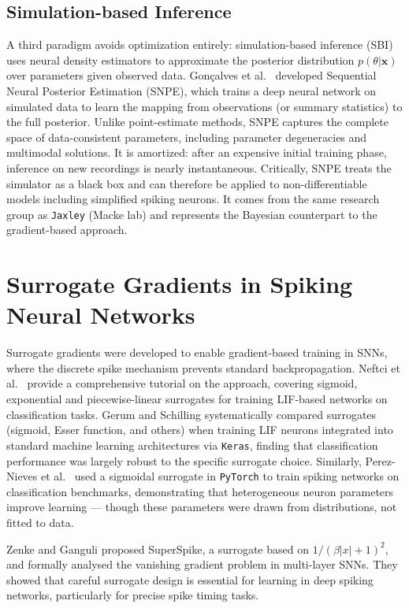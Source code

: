 \subsection{Simulation-based Inference}
A third paradigm avoids optimization entirely: simulation-based inference (SBI) uses neural density estimators to approximate the posterior distribution $p(\theta | \mathbf{x})$ over parameters given observed data.
Gon\c{c}alves et al.\ \cite{Goncalves2020} developed Sequential Neural Posterior Estimation (SNPE), which trains a deep neural network on simulated data to learn the mapping from observations (or summary statistics) to the full posterior.
Unlike point-estimate methods, SNPE captures the complete space of data-consistent parameters, including parameter degeneracies and multimodal solutions.
It is amortized: after an expensive initial training phase, inference on new recordings is nearly instantaneous.
Critically, SNPE treats the simulator as a black box and can therefore be applied to non-differentiable models including simplified spiking neurons.
It comes from the same research group as \texttt{Jaxley} (Macke lab) and represents the Bayesian counterpart to the gradient-based approach.

\section{Surrogate Gradients in Spiking Neural Networks}\label{sec:rw:sg-snn}

Surrogate gradients were developed to enable gradient-based training in \glspl{SNN}, where the discrete spike mechanism prevents standard backpropagation.
Neftci et al.\ \cite{Neftci2019} provide a comprehensive tutorial on the approach, covering sigmoid, exponential and piecewise-linear surrogates for training \gls{LIF}-based networks on classification tasks.
Gerum and Schilling \cite{Gerum2021} systematically compared surrogates (sigmoid, Esser function, and others) when training \gls{LIF} neurons integrated into standard machine learning architectures via \texttt{Keras}, finding that classification performance was largely robust to the specific surrogate choice.
Similarly, Perez-Nieves et al.\ \cite{Perez-Nieves2021} used a sigmoidal surrogate in \texttt{PyTorch} to train spiking networks on classification benchmarks, demonstrating that heterogeneous neuron parameters improve learning --- though these parameters were drawn from distributions, not fitted to data.

Zenke and Ganguli \cite{Zenke2018} proposed SuperSpike, a surrogate based on $1/(\beta|x|+1)^2$, and formally analysed the vanishing gradient problem in multi-layer \glspl{SNN}.
They showed that careful surrogate design is essential for learning in deep spiking networks, particularly for precise spike timing tasks.

